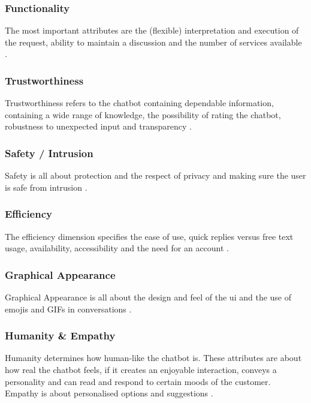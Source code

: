 \subsubsection{Functionality}
The most important attributes are the (flexible) interpretation and execution of the request, ability to maintain a discussion and the number of services available \citep{Muizzah2021, Verkeyn2018}.

\subsubsection{Trustworthiness}
Trustworthiness refers to the chatbot containing dependable information, containing a wide range of knowledge, the possibility of rating the chatbot, robustness to unexpected input and transparency \citep{Muizzah2021, Verkeyn2018}.

\subsubsection{Safety / Intrusion}
Safety is all about protection and the respect of privacy and making sure the user is safe from intrusion \citep{Muizzah2021, Verkeyn2018}.

\subsubsection{Efficiency}
The efficiency dimension specifies the ease of use, quick replies versus free text usage, availability, accessibility and the need for an account \citep{Muizzah2021, Verkeyn2018}.

\subsubsection{Graphical Appearance}
Graphical Appearance is all about the design and feel of the \acrshort{ui} and the use of emojis and GIFs in conversations \citep{Muizzah2021, Verkeyn2018}.

\subsubsection{Humanity \& Empathy}
Humanity determines how human-like the chatbot is. These attributes are about how real the chatbot feels, if it creates an enjoyable interaction, conveys a personality and can read and respond to certain moods of the customer.\\
Empathy is about personalised options and suggestions \citep{Muizzah2021, Verkeyn2018}.

